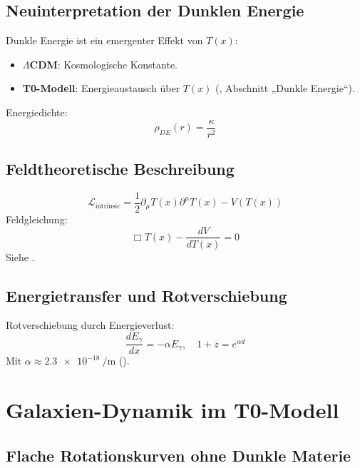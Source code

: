 \documentclass[a4paper,12pt]{article}
\theoremstyle{definition}
\theoremstyle{remark}
\newcommand{\Tfield}{T(x)}
\begin{document}
	\subsection{Neuinterpretation der Dunklen Energie}
	
	Dunkle Energie ist ein emergenter Effekt von \(\Tfield\):
	\begin{itemize}
		\item \textbf{\(\Lambda\)CDM}: Kosmologische Konstante.
		\item \textbf{T0-Modell}: Energieaustausch über \(\Tfield\) (\cite{pascher_energy_2025}, Abschnitt „Dunkle Energie“).
	\end{itemize}
	Energiedichte:
	\begin{equation}
		\rho_{DE}(r) = \frac{\kappa}{r^2}
	\end{equation}
	
	\subsection{Feldtheoretische Beschreibung}
	
	\begin{equation}
		\mathcal{L}_\text{intrinsic} = \frac{1}{2} \partial_\mu \Tfield \partial^\mu \Tfield - V(\Tfield)
	\end{equation}
	Feldgleichung:
	\begin{equation}
		\Box \Tfield - \frac{dV}{d\Tfield} = 0
	\end{equation}
	Siehe \cite{pascher_lagrange_2025}.
	
	\subsection{Energietransfer und Rotverschiebung}
	
	Rotverschiebung durch Energieverlust:
	\begin{equation}
		\frac{d E_{\gamma}}{d x} = -\alpha E_{\gamma}, \quad 1 + z = e^{\alpha d}
	\end{equation}
	Mit \(\alpha \approx \SI{2.3e-18}{\per\meter}\) (\cite{pascher_messdifferenzen_2025}).
	
	\section{Galaxien-Dynamik im T0-Modell}
	
	\subsection{Flache Rotationskurven ohne Dunkle Materie}
	
\end{document}

